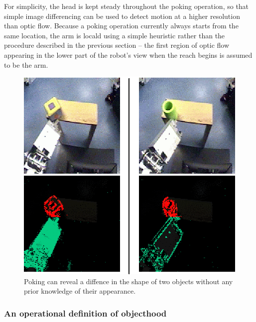 \ifverbose
For simplicity, the head is kept steady throughout the poking
operation, so that simple image differencing can be used to detect
motion at a higher resolution than optic flow.  Because a poking
operation currently always starts from the same location, the arm
is local\ize{}d using a simple heuristic rather than the procedure described
in the previous section -- the first region of optic flow appearing
in the lower part of the robot's view when the reach begins
is assumed to be the arm.
\fi

\ifverbose
\begin{figure}[tbh]
\begin{center}
\includegraphics[width=\columnwidth]{cube-and-cylinder.eps}
\caption{ 
\label{fig:cube-and-cylinder}
%
  Poking can reveal a diffence in the shape of two objects without
  any prior knowledge of their appearance.
%
}
\end{center}
\end{figure}
\fi




\subsubsection*{An operational definition of objecthood}

